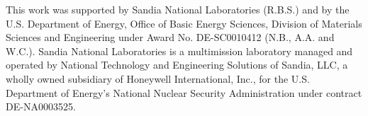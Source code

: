 \documentclass[%
reprint,
 amsmath,amssymb,
 aps,
superscriptaddress,
]{revtex4-1}
\begin{document}
\acknowledgements 

This work was supported by Sandia National Laboratories (R.B.S.) and by the U.S. Department
of Energy, Office of Basic Energy Sciences, Division of Materials Sciences and Engineering under
Award No. {DE-SC0010412} (N.B., A.A. and W.C.).
%
Sandia National Laboratories is a multimission laboratory managed and operated
by National Technology and Engineering Solutions of Sandia, LLC, a wholly owned
subsidiary of Honeywell International, Inc., for the U.S. Department of Energy’s
National Nuclear Security Administration under contract {DE-NA0003525}. 




%
\end{document}
